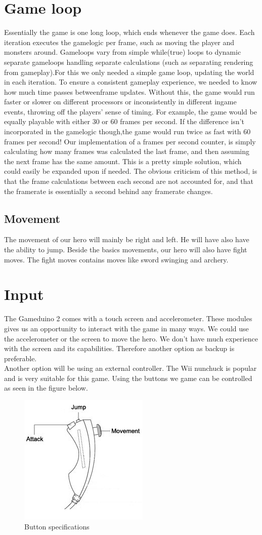\section{Game loop} Essentially the game is one long loop, which ends whenever
the game does. Each iteration executes the gamelogic per frame, such as moving
the player and monsters around. Gameloops vary from simple while(true) loops
to dynamic separate gameloops handling separate calculations (such as
separating rendering from gameplay).For this we only needed a simple game
loop, updating the world in each iteration. To ensure a consistent gameplay
experience, we needed to know how much time passes betweenframe updates.
Without this, the game would run faster or slower on different processors or
inconsistently in different ingame events, throwing off the players’ sense of
timing. For example, the game would be equally playable with either 30 or 60
frames per second. If the difference isn’t incorporated in the gamelogic
though,the game would run twice as fast with 60 frames per second! Our
implementation of a frames per second counter, is simply calculating how many
frames was calculated the last frame, and then assuming the next frame has the
same amount. This is a pretty simple solution, which could easily be expanded
upon if needed. The obvious criticism of this method, is that the frame
calculations between each second are not accounted for, and that the framerate
is essentially a second behind any framerate changes.

\subsection{Movement} The movement of our hero will mainly be right and left.
He will have also have the ability to jump. Beside the basics movements, our
hero will also have fight moves. The fight moves contains moves like sword
swinging and archery.

\section{Input} The Gameduino 2 comes with a touch screen and accelerometer.
These modules gives us an opportunity to interact with the game in many ways.
We could use the accelerometer or the screen to move the hero. We don’t have
much experience with the screen and its capabilities. Therefore another option
as backup is preferable.\\ Another option will be using an external controller.
The Wii nunchuck is popular and is very suitable for this game.  Using the
buttons we game can be controlled as seen in the figure below.

\begin{figure}[h] 
  \centering 
  \includegraphics[scale=0.6]{Figures/nunchuk}
  \caption{Button specifications} 
  \label{fig:Nunchuk} 
\end{figure}

